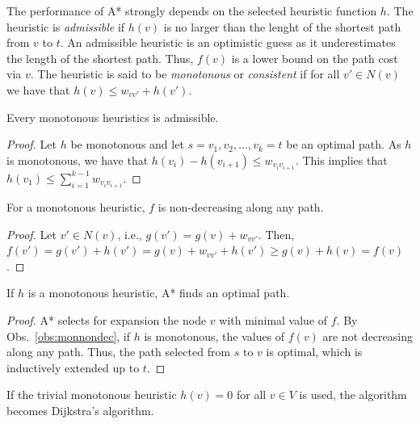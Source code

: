 The performance of A* strongly depends on the selected heuristic function $h$.
The heuristic is \emph{admissible} if $h(v)$ is no larger than the lenght of the shortest path from $v$ to $t$.
An admissible heuristic is an optimistic guess as it underestimates the length of the shortest path.
Thus, $f(v)$ is a lower bound on the path cost via $v$.
The heuristic is said to be \emph{monotonous} or \emph{consistent} if for all $v'\in N(v)$ we have that $h(v)\leq w_{vv'}+h(v')$.
\begin{observation}
Every monotonous heuristics is admissible.
\end{observation}
\begin{proof}
Let $h$ be monotonous and let $s=v_1,v_2,\dots,v_k=t$ be an optimal path.
As $h$ is monotonous, we have that $h(v_i)-h(v_{i+1})\leq w_{v_iv_{i+1}}$.
	This implies that $h(v_1)\leq\sum_{i=1}^{k-1}w_{v_iv_{i+1}}$.
\end{proof}
\begin{observation}
For a monotonous heuristic, $f$ is non-decreasing along any path.
\end{observation}
\begin{proof}\label{obs:monnondec}
	Let $v'\in N(v)$, i.e., $g(v')=g(v)+w_{vv'}$.
Then, $f(v')=g(v')+h(v')=g(v)+w_{vv'}+h(v')\geq g(v)+h(v)=f(v)$.
\end{proof}
\begin{proposition}
If $h$ is a monotonous heuristic, A* finds an optimal path.
\end{proposition}
\begin{proof}
	A* selects for expansion the node $v$ with minimal value of $f$. 
	By Obs.~\ref{obs:monnondec}, if $h$ is monotonous, the values of $f(v)$ are not decreasing along any path.
	Thus, the path selected from $s$ to $v$ is optimal, which is inductively extended up to $t$.
\end{proof}
If the trivial monotonous heuristic $h(v)=0$ for all $v\in V$ is used, the algorithm becomes Dijkstra's algorithm.


